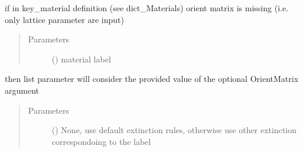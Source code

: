 \documentclass[letterpaper,10pt,english]{sphinxmanual}
\begin{document}
\begin{fulllineitems}
if in key\_material definition (see dict\_Materials) orient matrix is missing
(i.e. only lattice parameter are input)
\begin{quote}\begin{description}
\item[{Parameters}] \leavevmode
{} () \textendash{} material label

\end{description}\end{quote}

then list parameter will consider the provided value of the optional
OrientMatrix argument
\begin{quote}\begin{description}
\item[{Parameters}] \leavevmode
{} () \textendash{} None, use default extinction rules,
otherwise use other extinction correspondoing to the label

\end{description}\end{quote}

\end{fulllineitems}

\end{document}
